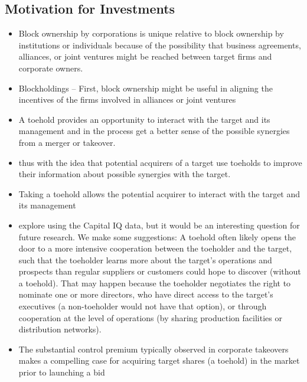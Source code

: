 \documentclass[12pt]{article}
\begin{document}
\subsection{Motivation for Investments}

\begin{itemize}
    \item Block ownership by corporations is unique relative to block ownership by institutions or individuals because of the possibility that business agreements, alliances, or joint ventures might be reached between target firms and corporate owners. \citep{Allen2000}

    \item Blockholdings -- First, block ownership might be useful in aligning the incentives of the firms involved in alliances or joint ventures \citep{Allen2000}

    \item A toehold provides an opportunity to interact with the target and its management and in the process get a better sense of the possible synergies from a merger or takeover. \citep{Povel2014}

    \item thus with the idea that potential acquirers of a target use toeholds to improve their information about possible synergies with the target. \citep{Povel2014}

    \item Taking a toehold allows the potential acquirer to interact with the target and its management \citep{Povel2014}

    \item explore using the Capital IQ data, but it would be an interesting question for future research. We make some suggestions: A toehold often likely opens the door to a more intensive cooperation between the toeholder and the target, such that the toeholder learns more about the target's operations and prospects than regular suppliers or customers could hope to discover (without a toehold). That may happen because the toeholder negotiates the right to nominate one or more directors, who have direct access to the target's executives (a non-toeholder would not have that option), or through cooperation at the level of operations (by sharing production facilities or distribution networks). \citep{Povel2014}

    \item The substantial control premium typically observed in corporate takeovers makes a compelling case for acquiring target shares (a toehold) in the market prior to launching a bid \citep{Betton2009}


\end{itemize}
\end{document}
